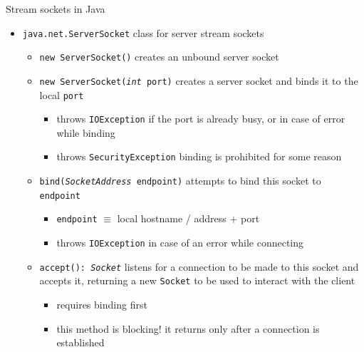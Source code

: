 \documentclass[presentation]{beamer}\mode<presentation>{\usetheme{AMSBolognaFC}}
\begin{document}
\begin{frame}[c, allowframebreaks]{Stream sockets in Java}
\begin{itemize}
\begin{itemize}
            \item \alert{\texttt{shutdownInput()}} closes the \texttt{Socket}'s input stream alone
            
            \item \alert{\texttt{shutdownOutput()}} closes the \texttt{Socket}'s output stream alone
        \end{itemize}

        \framebreak

        \item \texttt{java.net.\alert{ServerSocket}} class for \alert{server} stream sockets 
        \begin{itemize}
            \item \alert{\texttt{new ServerSocket()}} creates an unbound server socket
            \item \alert{\texttt{new ServerSocket(\textit{int} port)}} creates a server socket and binds it to the local \texttt{port}
            \begin{itemize}
                \item throws \texttt{IOException} if the port is already busy, or in case of error while binding
                \item throws \texttt{SecurityException} binding is prohibited for some reason
            \end{itemize}

            \item \alert{\texttt{bind(\textit{SocketAddress} endpoint)}} attempts to bind this socket to \texttt{endpoint}
            \begin{itemize}
                \item \texttt{endpoint} $\equiv$ local hostname / address + port
                \item throws \texttt{IOException} in case of an error while connecting
            \end{itemize}

            \item \alert{\texttt{accept(): \textit{Socket}}} listens for a connection to be made to this socket and accepts it, returning a new \texttt{Socket} to be used to interact with the client
            \begin{itemize}
                \item requires binding first
                \item this method is blocking! it returns only after a connection is established
            \end{itemize}


\end{itemize}
\end{itemize}
\end{frame}
\end{document}
